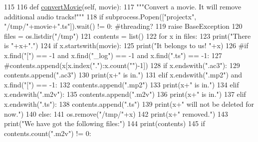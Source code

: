 \begin{DoxyCode}
115 
116     \textcolor{keyword}{def }\hyperlink{classmovies2hdd_1_1_movies2_h_d_d_afafc16b9fc0e83485db9b47d7ba7e386}{convertMovie}(self, movie):
117         \textcolor{stringliteral}{"""Convert a movie. It will remove additional audio tracks!"""}
118         \textcolor{keywordflow}{if} subprocess.Popen([\textcolor{stringliteral}{"projectx"}, \textcolor{stringliteral}{"/tmp/"}+movie+\textcolor{stringliteral}{".ts"}]).wait() != 0: \textcolor{comment}{#threading?}
119             \textcolor{keywordflow}{raise} BaseException
120         files = os.listdir(\textcolor{stringliteral}{"/tmp"})
121         contents = list()
122         \textcolor{keywordflow}{for} x \textcolor{keywordflow}{in} files:
123             print(\textcolor{stringliteral}{"There is "}+x+\textcolor{stringliteral}{"."})
124             \textcolor{keywordflow}{if} x.startswith(movie):
125                 print(\textcolor{stringliteral}{"It belongs to us! "}+x)
126                 \textcolor{comment}{#if x.find("[") == -1 and x.find("\_log") == -1 and x.find(".ts") == -1:}
127                     \textcolor{comment}{#contents.append(x[x.index("."):x.count("")-1])}
128                 \textcolor{keywordflow}{if} x.endswith(\textcolor{stringliteral}{".ac3"}):
129                     contents.append(\textcolor{stringliteral}{".ac3"})
130                     print(x+\textcolor{stringliteral}{" is in."})
131                 \textcolor{keywordflow}{elif} x.endswith(\textcolor{stringliteral}{".mp2"}) \textcolor{keywordflow}{and} x.find(\textcolor{stringliteral}{"["}) == -1:
132                     contents.append(\textcolor{stringliteral}{".mp2"})
133                     print(x+\textcolor{stringliteral}{" is in."})
134                 \textcolor{keywordflow}{elif} x.endswith(\textcolor{stringliteral}{".m2v"}):
135                     contents.append(\textcolor{stringliteral}{".m2v"})
136                     print(x+\textcolor{stringliteral}{" is in."})
137                 \textcolor{keywordflow}{elif} x.endswith(\textcolor{stringliteral}{".ts"}):
138                     contents.append(\textcolor{stringliteral}{".ts"})
139                     print(x+\textcolor{stringliteral}{" will not be deleted for now."})
140                 \textcolor{keywordflow}{else}:
141                     os.remove(\textcolor{stringliteral}{"/tmp/"}+x)
142                     print(x+\textcolor{stringliteral}{" removed."})
143         print(\textcolor{stringliteral}{"We have got the following files:"})
144         print(contents)
145         \textcolor{keywordflow}{if} contents.count(\textcolor{stringliteral}{".m2v"}) != 0:

\end{DoxyCode}
